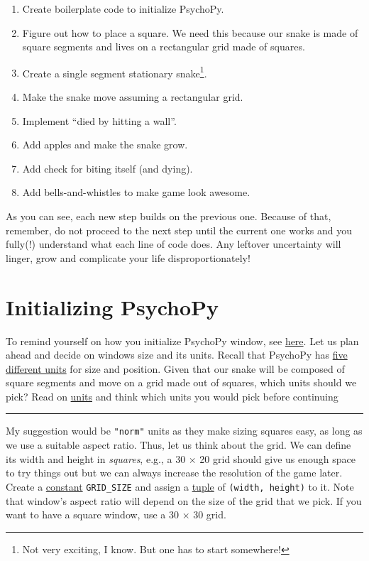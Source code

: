 \documentclass[
]{book}
\providecommand{\tightlist}{%
  \setlength{\itemsep}{0pt}\setlength{\parskip}{0pt}}
\begin{document}
\begin{enumerate}
\def\labelenumi{\arabic{enumi}.}
\tightlist
\item
  Create boilerplate code to initialize PsychoPy.
\item
  Figure out how to place a square. We need this because our snake is made of square segments and lives on a rectangular grid made of squares.
\item
  Create a single segment stationary snake\footnote{Not very exciting, I know. But one has to start somewhere!}.
\item
  Make the snake move assuming a rectangular grid.
\item
  Implement ``died by hitting a wall''.
\item
  Add apples and make the snake grow.
\item
  Add check for biting itself (and dying).
\item
  Add bells-and-whistles to make game look awesome.
\end{enumerate}

As you can see, each new step builds on the previous one. Because of that, remember, do not proceed to the next step until the current one works and you fully(!) understand what each line of code does. Any leftover uncertainty will linger, grow and complicate your life disproportionately!

\hypertarget{initializing-psychopy}{%
\section{Initializing PsychoPy}\label{initializing-psychopy}}

To remind yourself on how you initialize PsychoPy window, see \protect\hyperlink{seminar08}{here}. Let us plan ahead and decide on windows size and its units. Recall that PsychoPy has \protect\hyperlink{psychopy-units}{five different units} for size and position. Given that our snake will be composed of square segments and move on a grid made out of squares, which units should we pick? Read on \protect\hyperlink{psychopy-units}{units} and think which units you would pick before continuing

\begin{center}\rule{0.5\linewidth}{0.5pt}\end{center}

My suggestion would be \texttt{"norm"} units as they make sizing squares easy, as long as we use a suitable aspect ratio. Thus, let us think about the grid. We can define its width and height in \emph{squares}, e.g., a 30 × 20 grid should give us enough space to try things out but we can always increase the resolution of the game later. Create a \protect\hyperlink{constants}{constant} \texttt{GRID\_SIZE} and assign a \href{https://docs.python.org/3/tutorial/datastructures.html\#tuples-and-sequences}{tuple} of \texttt{(width,\ height)} to it. Note that window's aspect ratio will depend on the size of the grid that we pick. If you want to have a square window, use a 30 × 30 grid.
\end{document}
